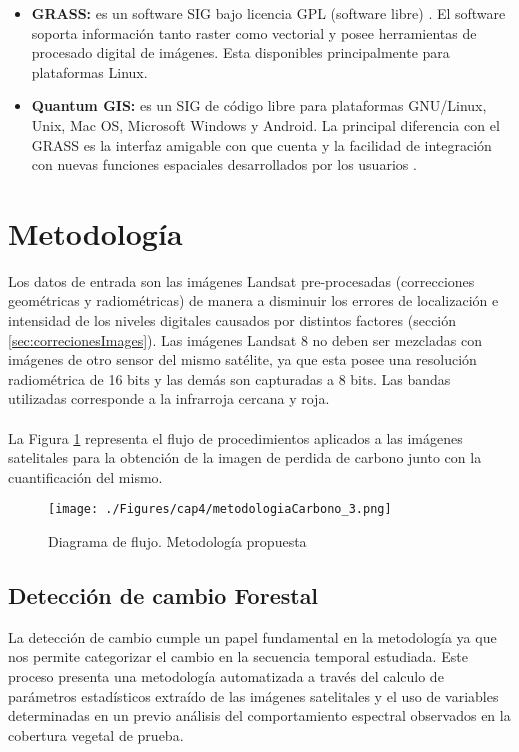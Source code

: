 \begin{itemize}
	\item \textbf{GRASS: }es un software SIG  bajo licencia GPL (software libre) \cite{osgeoGrass}. El software soporta informaci\'on tanto raster como vectorial y posee herramientas de procesado digital de im\'agenes. Esta disponibles principalmente para plataformas Linux.
	\item \textbf{Quantum GIS: }es un SIG de c\'odigo libre para plataformas GNU/Linux, Unix, Mac OS, Microsoft Windows y Android. La principal diferencia con el GRASS es la interfaz amigable con que cuenta y la facilidad de integraci\'on con nuevas funciones espaciales desarrollados por los usuarios \cite{qgisSIG}.
\end{itemize}

\section{Metodolog\'ia}
Los datos de entrada son las im\'agenes Landsat pre-procesadas (correcciones geom\'etricas y radiom\'etricas) de manera a disminuir los errores de localizaci\'on e intensidad de los niveles digitales causados por distintos factores (secci\'on \ref{sec:correcionesImages}).  
Las im\'agenes Landsat 8 no deben ser mezcladas con im\'agenes de otro sensor del mismo sat\'elite, ya que esta posee una resoluci\'on radiom\'etrica de 16 bits y las dem\'as son capturadas a 8 bits. Las bandas utilizadas corresponde a la infrarroja cercana y roja.\\~\\
La Figura \ref{fig:metodologiapc} representa el flujo de procedimientos aplicados a las im\'agenes satelitales para la obtenci\'on de la imagen de perdida de carbono junto con la cuantificaci\'on del mismo.

\begin{figure}[H]
	\centering
	\texttt{[image: ./Figures/cap4/metodologiaCarbono\_3.png]}
	\caption{Diagrama de flujo. Metodolog\'ia propuesta}
	\label{fig:metodologiapc}
\end{figure}

\subsection{Detecci\'on de cambio Forestal}
La detecci\'on de cambio cumple un papel fundamental en la metodolog\'ia ya que nos permite categorizar el cambio en la secuencia temporal estudiada. Este proceso presenta una metodolog\'ia automatizada a trav\'es del calculo de par\'ametros estad\'isticos extra\'ido de las im\'agenes satelitales y el uso de variables determinadas en un previo an\'alisis del comportamiento espectral observados en la cobertura vegetal de prueba.

